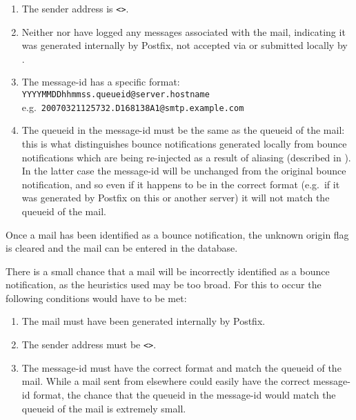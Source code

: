 \begin{enumerate}

    \item The sender address is \verb!<>!.\glsadd{<>}

    \item Neither  nor  have logged any
        messages associated with the mail, indicating it was generated
        internally by Postfix, not accepted via  or submitted
        locally by .

    \item The message-id has a specific format: \newline{}
        \tab{} \texttt{YYYYMMDDhhmmss.queueid@server.hostname} \newline{}
        e.g.\ \texttt{20070321125732.D168138A1@smtp.example.com}

    \item The queueid in the message-id must be the same as the queueid of
        the mail: this is what distinguishes bounce notifications generated
        locally from bounce notifications which are being re-injected as a
        result of aliasing (described in ).
        In the latter case the message-id will be unchanged from the
        original bounce notification, and so even if it happens to be in
        the correct format (e.g.\ if it was generated by Postfix on this or
        another server) it will not match the queueid of the mail.

\end{enumerate}

Once a mail has been identified as a bounce notification, the unknown
origin flag is cleared and the mail can be entered in the database.

There is a small chance that a mail will be incorrectly identified as a
bounce notification, as the heuristics used may be too broad.  For this to
occur the following conditions would have to be met:

\begin{enumerate}

    \item The mail must have been generated internally by Postfix.

    \item The sender address must be \verb!<>!.\glsadd{<>}

    \item The message-id must have the correct format and match the queueid
        of the mail.  While a mail sent from elsewhere could easily have
        the correct message-id format, the chance that the queueid in the
        message-id would match the queueid of the mail is extremely small.

\end{enumerate}

